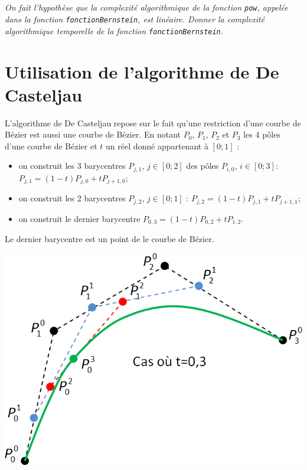 \documentclass[10pt,fleqn]{article} %
\begin{document}
\subparagraph{}
\textit{On fait l'hypothèse que la complexité algorithmique de la fonction \texttt{pow}, appelée dans la fonction \texttt{fonctionBernstein}, est linéaire. Donner la complexité algorithmique temporelle de la fonction \texttt{fonctionBernstein}.}


\section{Utilisation de l'algorithme de De Casteljau}
\ifprof
\else

\begin{minipage}[c]{0.6\linewidth}
L'algorithme de De Casteljau repose sur le fait qu'une restriction d'une courbe de Bézier est aussi une courbe de Bézier. En notant $P_0$, $P_1$, $P_2$ et $P_3$ les 4 pôles d'une courbe de Bézier et $t$ un réel donné appartenant à $[0;1]$ : 
\begin{itemize}[label=,font=\color{ocre}] 
\item on construit les 3 barycentres $P_{j,1}$, $j \in [0;2]$ des pôles $P_{i,0}$, $i\in[0;3]$: $P_{j,1} = \left(1-t\right)P_{j,0} + tP_{{j+1},{0}}$;
\item on construit les 2 barycentres $P_{j,2}$, $j \in [0;1]$ : $P_{j,2} = \left(1-t\right)P_{j,1} + tP_{{j+1},{1}}$;
\item on construit le dernier barycentre  $P_{0,3} = \left(1-t\right)P_{0,2} + tP_{{1},{2}}$.
\end{itemize}
Le dernier barycentre est un point de le courbe de Bézier. 
\end{minipage} \hfill
\begin{minipage}[c]{0.37\linewidth}
\begin{center}
\includegraphics[width=.9\linewidth]{images/casteljau}
\end{center}
\end{minipage}
\fi
\end{document}
